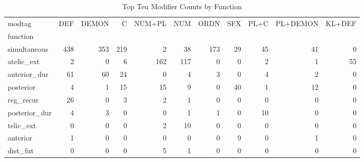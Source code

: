 \begin{table}[htbp!]
\centering
\caption{Top Ten Modifier Counts by Function}
\label{table:afmod_ct}
\begin{adjustbox}{width=1\textwidth}
\begin{tabular}{lrrrrrrrrrr}
\toprule
modtag &  DEF &  DEMON &    C &  NUM+PL &  NUM &  ORDN &  SFX &  PL+C &  PL+DEMON &  KL+DEF \\
function      &      &        &      &         &      &       &      &       &           &         \\
\midrule
simultaneous  &  438 &    353 &  219 &       2 &   38 &   173 &   29 &    45 &        41 &       0 \\
atelic\_ext    &    2 &      0 &    6 &     162 &  117 &     0 &    0 &     2 &         1 &      55 \\
anterior\_dur  &   61 &     60 &   24 &       0 &    4 &     3 &    0 &     4 &         2 &       0 \\
posterior     &    4 &      1 &   15 &      15 &    9 &     0 &   40 &     1 &        12 &       0 \\
reg\_recur     &   26 &      0 &    3 &       2 &    1 &     0 &    0 &     0 &         0 &       0 \\
posterior\_dur &    4 &      3 &    0 &       0 &    1 &     1 &    0 &    10 &         0 &       0 \\
telic\_ext     &    0 &      0 &    0 &       2 &   10 &     0 &    0 &     0 &         0 &       0 \\
anterior      &    1 &      0 &    0 &       0 &    0 &     0 &    9 &     0 &         1 &       0 \\
dist\_fut      &    0 &      0 &    0 &       5 &    1 &     0 &    0 &     0 &         0 &       0 \\
\bottomrule
\end{tabular}
\end{adjustbox}
\end{table}
